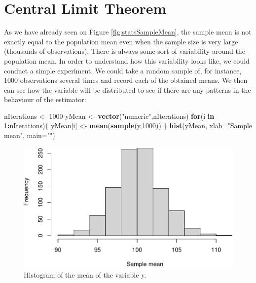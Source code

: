 \documentclass[
]{book}
\newenvironment{Shaded}{\begin{snugshade}}{\end{snugshade}}
\newcommand{\ControlFlowTok}[1]{\textcolor[rgb]{0.13,0.29,0.53}{\textbf{#1}}}
\newcommand{\DataTypeTok}[1]{\textcolor[rgb]{0.13,0.29,0.53}{#1}}
\newcommand{\DecValTok}[1]{\textcolor[rgb]{0.00,0.00,0.81}{#1}}
\newcommand{\KeywordTok}[1]{\textcolor[rgb]{0.13,0.29,0.53}{\textbf{#1}}}
\newcommand{\NormalTok}[1]{#1}
\newcommand{\OperatorTok}[1]{\textcolor[rgb]{0.81,0.36,0.00}{\textbf{#1}}}
\newcommand{\StringTok}[1]{\textcolor[rgb]{0.31,0.60,0.02}{#1}}
\theoremstyle{definition}
\theoremstyle{definition}
\theoremstyle{definition}
\theoremstyle{definition}
\theoremstyle{remark}
\begin{document}
\hypertarget{CLT}{%
\section{Central Limit Theorem}\label{CLT}}

As we have already seen on Figure \ref{fig:statsSampleMean}, the sample mean is not exactly equal to the population mean even when the sample size is very large (thousands of observations). There is always some sort of variability around the population mean. In order to understand how this variability looks like, we could conduct a simple experiment. We could take a random sample of, for instance, 1000 observations several times and record each of the obtained means. We then can see how the variable will be distributed to see if there are any patterns in the behaviour of the estimator:

\begin{Shaded}
\begin{Highlighting}[]
\NormalTok{nIterations \textless{}{-}}\StringTok{ }\DecValTok{1000}
\NormalTok{yMean \textless{}{-}}\StringTok{ }\KeywordTok{vector}\NormalTok{(}\StringTok{"numeric"}\NormalTok{,nIterations)}
\ControlFlowTok{for}\NormalTok{(i }\ControlFlowTok{in} \DecValTok{1}\OperatorTok{:}\NormalTok{nIterations)\{}
\NormalTok{    yMean[i] \textless{}{-}}\StringTok{ }\KeywordTok{mean}\NormalTok{(}\KeywordTok{sample}\NormalTok{(y,}\DecValTok{1000}\NormalTok{))}
\NormalTok{\}}
\KeywordTok{hist}\NormalTok{(yMean, }\DataTypeTok{xlab=}\StringTok{"Sample mean"}\NormalTok{, }\DataTypeTok{main=}\StringTok{""}\NormalTok{)}
\end{Highlighting}
\end{Shaded}

\begin{figure}
\centering
\includegraphics{Svetunkov---Statistics-for-Business-Analytics_files/figure-latex/histyMean-1.pdf}
\caption{\label{fig:histyMean}Histogram of the mean of the variable y.}
\end{figure}
\end{document}
